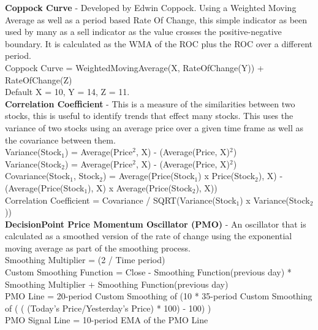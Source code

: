 \documentclass[12pt,a4paper]{article}
\begin{document}
\iffalse
[]
\fi

\textbf{Coppock Curve} - Developed by Edwin Coppock. Using a Weighted Moving Average as well as a period based Rate Of Change, this simple indicator as been used by many as a sell indicator as the value crosses the positive-negative boundary. It is calculated as the WMA of the ROC plus the ROC over a different period.\\

Coppock Curve = WeightedMovingAverage(X, RateOfChange(Y)) + RateOfChange(Z)\\
Default X = 10, Y = 14, Z = 11. \\

\iffalse
[]
\fi

\textbf{Correlation Coefficient} - This is a measure of the similarities between two stocks, this is useful to identify trends that effect many stocks. This uses the variance of two stocks using an average price over a given time frame as well as the covariance between them.\\

Variance(Stock$_1$) = Average(Price$^2$, X) - (Average(Price, X)$^2$)\\
Variance(Stock$_2$) = Average(Price$^2$, X) - (Average(Price, X)$^2$)\\
Covariance(Stock$_1$, Stock$_2$) = Average(Price(Stock$_1$) x Price(Stock$_2$), X) - (Average(Price(Stock$_1$), X) x Average(Price(Stock$_2$), X))\\
Correlation Coefficient = Covariance / SQRT(Variance(Stock$_1$) x Variance(Stock$_2$))\\

\iffalse
[]
\fi

\textbf{DecisionPoint Price Momentum Oscillator (PMO)} - An oscillator that is calculated as a smoothed version of the rate of change using the exponential moving average as part of the smoothing process. \\

Smoothing Multiplier = (2 / Time period)\\
Custom Smoothing Function = {Close - Smoothing Function(previous day)} * Smoothing Multiplier + Smoothing Function(previous day) \\
PMO Line = 20-period Custom Smoothing of (10 * 35-period Custom Smoothing of ( ( (Today's Price/Yesterday's Price) * 100) - 100) )\\
PMO Signal Line = 10-period EMA of the PMO Line\\

\iffalse
[]
\fi
\end{document}
